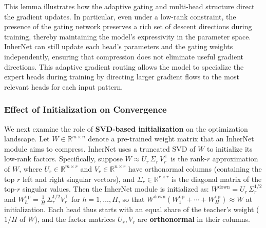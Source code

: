 \documentclass{article} %
\begin{document}
This lemma illustrates how the adaptive gating and multi-head structure direct the gradient updates. In particular, even under a low-rank constraint, the presence of the gating network preserves a rich set of descent directions during training, thereby maintaining the model's expressivity in the parameter space. InherNet can still update each head's parameters and the gating weights independently, ensuring that compression does not eliminate useful gradient directions. This adaptive gradient routing allows the model to specialize the expert heads during training by directing larger gradient flows to the most relevant heads for each input pattern.


\subsubsection{Effect of Initialization on Convergence}

We next examine the role of \textbf{SVD-based initialization} on the optimization landscape. Let $W \in \mathbb{R}^{m\times n}$ denote a pre-trained weight matrix that an InherNet module aims to compress. InherNet uses a truncated SVD of $W$ to initialize its low-rank factors. Specifically, suppose $W \approx U_r\,\Sigma_r\,V_r^\top$ is the rank-$r$ approximation of $W$, where $U_r \in \mathbb{R}^{m\times r}$ and $V_r \in \mathbb{R}^{n\times r}$ have orthonormal columns (containing the top $r$ left and right singular vectors), and $\Sigma_r \in \mathbb{R}^{r\times r}$ is the diagonal matrix of the top-$r$ singular values. Then the InherNet module is initialized as: \(W^{\text{down}} = U_r\,\Sigma_r^{1/2}\) and \(W^{\text{up}}_h = \frac{1}{H}\,\Sigma_r^{1/2} V_r^\top\) for \(h=1,\dots,H\), so that $W^{\text{down}}(W^{\text{up}}_1 + \cdots + W^{\text{up}}_H) \approx W$ at initialization. Each head thus starts with an equal share of the teacher's weight ($1/H$ of $W$), and the factor matrices $U_r, V_r$ are \textbf{orthonormal} in their columns.

\end{document}
